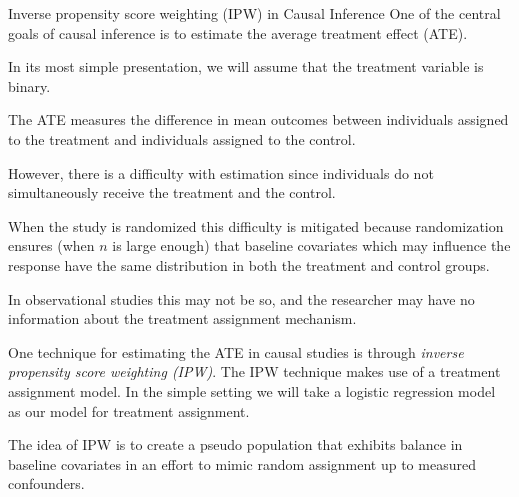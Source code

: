 \documentclass[
  ignorenonframetext,
]{beamer}
\begin{document}
\begin{frame}{Inverse propensity score weighting (IPW) in Causal
Inference}
\protect\hypertarget{inverse-propensity-score-weighting-ipw-in-causal-inference}{}
One of the central goals of causal inference is to estimate the average
treatment effect (ATE).

\vspace{12pt}

In its most simple presentation, we will assume that the treatment
variable is binary.

\vspace{12pt}

The ATE measures the difference in mean outcomes between individuals
assigned to the treatment and individuals assigned to the control.

\vspace{12pt}

However, there is a difficulty with estimation since individuals do not
simultaneously receive the treatment and the control.
\end{frame}

\begin{frame}{}
\protect\hypertarget{section-12}{}
When the study is randomized this difficulty is mitigated because
randomization ensures (when \(n\) is large enough) that baseline
covariates which may influence the response have the same distribution
in both the treatment and control groups.

\vspace{12pt}

In observational studies this may not be so, and the researcher may have
no information about the treatment assignment mechanism.

\vspace{12pt}

One technique for estimating the ATE in causal studies is through
\emph{inverse propensity score weighting (IPW)}. The IPW technique makes
use of a treatment assignment model. In the simple setting we will take
a logistic regression model as our model for treatment assignment.

\vspace{12pt}

The idea of IPW is to create a pseudo population that exhibits balance
in baseline covariates in an effort to mimic random assignment up to
measured confounders.
\end{frame}
\end{document}
